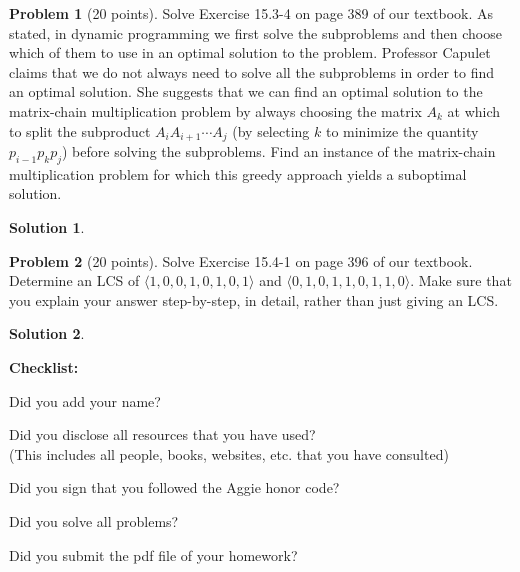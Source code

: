 \documentclass{article}
\theoremstyle{definition}
\newtheorem{problem}{Problem}
\newtheorem*{solution}{Solution}
\newcommand{\checklist}{\noindent\textbf{Checklist:}
\begin{compactitem}[$\Box$] 
\item Did you add your name? 
\item Did you disclose all resources that you have used? \\
(This includes all people, books, websites, etc. that you have consulted)
\item Did you sign that you followed the Aggie honor code? 
\item Did you solve all problems? 
\item Did you submit the pdf file of your homework?
\end{compactitem}
}
\begin{document}
\begin{problem}[20 points]
  Solve Exercise 15.3-4 on page 389 of our textbook. As stated, in
  dynamic programming we first solve the subproblems and then choose
  which of them to use in an optimal solution to the
  problem. Professor Capulet claims that we do not always need to
  solve all the subproblems in order to find an optimal solution. She
  suggests that we can find an optimal solution to the matrix-chain
  multiplication problem by always choosing the matrix $A_k$
  at which to split the subproduct $A_iA_{i+1}\cdots A_j$ (by selecting $k$ to minimize the
  quantity $p_{i-1}p_kp_j$) before solving the subproblems. Find an instance
  of the matrix-chain multiplication problem for which this greedy
  approach yields a suboptimal solution.
\end{problem}
\begin{solution}
\end{solution}

\begin{problem}[20 points]
  Solve Exercise 15.4-1 on page 396 of our textbook.
  Determine an LCS of $\langle 1,0,0,1,0,1,0,1\rangle$ and
  $\langle0,1,0,1,1,0,1,1,0\rangle$. Make sure that you explain your
  answer step-by-step, in detail, rather than just giving an LCS. 
\end{problem}
\begin{solution}
\end{solution}




\goodbreak
\checklist
\end{document}
